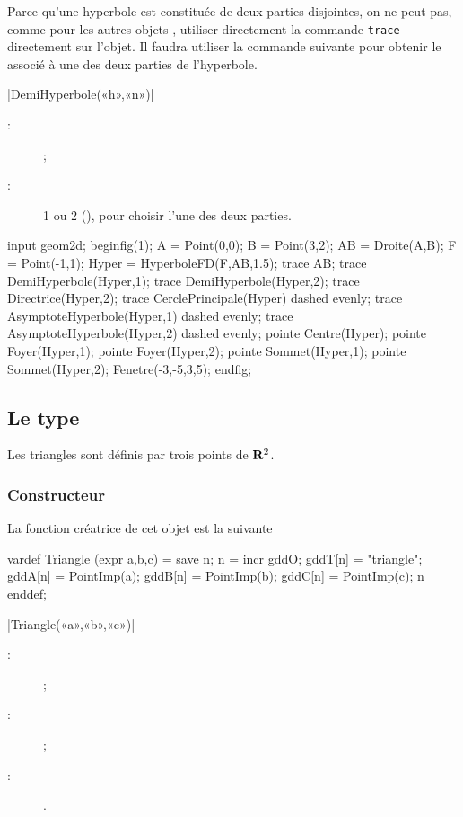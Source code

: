 \documentclass[a4paper,french]{article}
\begin{document}
Parce qu'une hyperbole est constituée de deux parties disjointes, on ne peut
pas, comme pour les autres objets \mpgeomdd, utiliser directement la commande
\lstinline+trace+ directement sur l'objet. Il faudra utiliser la commande
suivante pour obtenir le  associé à une des deux parties de
l'hyperbole.

\begin{colourband}
  \macro|DemiHyperbole(«h»,«n»)|
  \begin{description}
    \item[:]   ;
    \item[:]  1 ou 2 (), pour choisir l'une des deux
    parties. 
  \end{description}
\end{colourband}
\bigskip



\begin{ExempleMP}
input geom2d;
beginfig(1);
A = Point(0,0);
B = Point(3,2);
AB = Droite(A,B);
F = Point(-1,1);
Hyper = HyperboleFD(F,AB,1.5);
trace AB;
trace DemiHyperbole(Hyper,1);
trace DemiHyperbole(Hyper,2);
trace Directrice(Hyper,2);
trace CerclePrincipale(Hyper) dashed evenly;
trace AsymptoteHyperbole(Hyper,1) dashed evenly;
trace AsymptoteHyperbole(Hyper,2) dashed evenly;
pointe Centre(Hyper);
pointe Foyer(Hyper,1);
pointe Foyer(Hyper,2);
pointe Sommet(Hyper,1);
pointe Sommet(Hyper,2);
Fenetre(-3,-5,3,5);
endfig;
\end{ExempleMP}


\subsection{Le type }

Les triangles sont définis par trois
points de $\mathbf{R}^2$.

\subsubsection{Constructeur}
La fonction créatrice de cet objet est la suivante
\begin{mpcode}
vardef Triangle (expr a,b,c) =
  save n; n = incr gddO; gddT[n] = "triangle";
  gddA[n] = PointImp(a); gddB[n] = PointImp(b); gddC[n] = PointImp(c); n
enddef;
\end{mpcode}

\begin{colourband}
\macro|Triangle(«a»,«b»,«c»)|
\begin{description}
  \item[:]   ;
  \item[:]   ;
  \item[:]  .
\end{description}
\end{colourband}
\end{document}
